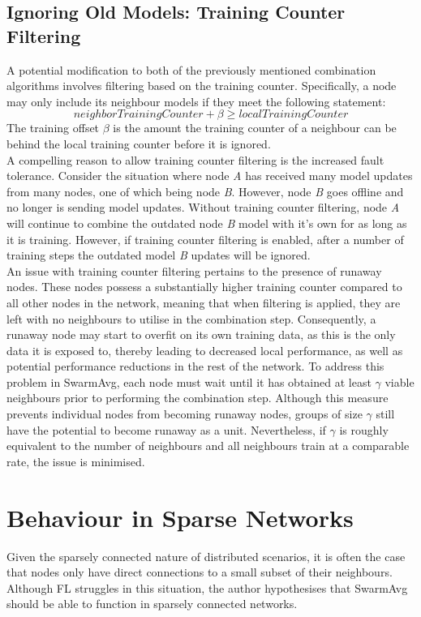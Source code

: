 \subsection{Ignoring Old Models: Training Counter Filtering}
A potential modification to both of the previously mentioned combination algorithms involves filtering based on the training counter. Specifically, a node may only include its neighbour models if they meet the following statement:
\[neighborTrainingCounter + \beta \ge localTrainingCounter \]
The training offset $\beta$ is the amount the training counter of a neighbour can be behind the local training counter before it is ignored. \\

A compelling reason to allow training counter filtering is the increased fault tolerance. Consider the situation where node \emph{A} has received many model updates from many nodes, one of which being node \emph{B}. However, node \emph{B} goes offline and no longer is sending model updates. Without training counter filtering, node \emph{A} will continue to combine the outdated node \emph{B} model with it's own for as long as it is training. However, if training counter filtering is enabled, after a number of training steps the outdated model \emph{B} updates will be ignored. \\

An issue with training counter filtering pertains to the presence of runaway nodes. These nodes possess a substantially higher training counter compared to all other nodes in the network, meaning that when filtering is applied, they are left with no neighbours to utilise in the combination step. Consequently, a runaway node may start to overfit on its own training data, as this is the only data it is exposed to, thereby leading to decreased local performance, as well as potential performance reductions in the rest of the network. To address this problem in SwarmAvg, each node must wait until it has obtained at least $\gamma$ viable neighbours prior to performing the combination step. Although this measure prevents individual nodes from becoming runaway nodes, groups of size $\gamma$ still have the potential to become runaway as a unit. Nevertheless, if $\gamma$ is roughly equivalent to the number of neighbours and all neighbours train at a comparable rate, the issue is minimised.

\section{Behaviour in Sparse Networks}
Given the sparsely connected nature of distributed scenarios, it is often the case that nodes only have direct connections to a small subset of their neighbours. Although FL struggles in this situation, the author hypothesises that SwarmAvg should be able to function in sparsely connected networks.

